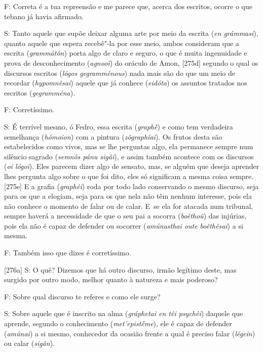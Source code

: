 F: Correta é a tua repreensão e me parece que, acerca dos escritos,
ocorre o que tebano já havia afirmado.

 

S: Tanto aquele que supõe deixar alguma arte por meio da escrita
(\emph{en grámmasi}), quanto aquele que espera recebê"-la por esse meio,
ambos consideram que a escrita (\emph{grammátôn}) porta algo de claro e
seguro, o que é muita ingenuidade e prova de desconhecimento
(\emph{agnooî}) do oráculo de Amon, [275d] segundo o qual os
discursos escritos (\emph{lógos gegramménous}) nada mais são do que um
meio de recordar (\emph{hypomnêsai}) aquele que já conhece
(\emph{eidóta}) os assuntos tratados nos escritos (\emph{gegramména}).

 

F: Corretíssimo.

 

S: É terrível mesmo, ó Fedro, essa escrita (\emph{graphḕ}) e como tem
verdadeira semelhança (\emph{hómoion}) com a pintura
(\emph{zôgraphíai}). Os frutos desta são estabelecidos como vivos, mas
se lhe perguntas algo, ela permanece sempre num silêncio sagrado
(\emph{semnôs pánu sigâi}), e assim também acontece com os discursos
(\emph{oi lógoi}). Eles parecem dizer algo de sensato, mas, se alguém
que deseja aprender lhes pergunta algo sobre o que foi dito, eles só
significam a mesma coisa sempre. [275e] E a grafia (\emph{graphêi})
roda por todo lado conservando o mesmo discurso, seja para os que a
elogiam, seja para os que nela não têm nenhum interesse, pois ela não
conhece o momento de falar ou de calar. E~se ela for atacada num
tribunal, sempre haverá a necessidade de que o seu pai a socorra
(\emph{boêthoû}) das injúrias, pois ela não é capaz de defender ou
socorrer (\emph{amúnasthai oute boêthêsai}) a si mesma.

 

F: Também isso que dizes é corretíssimo.

 

[276a] S: O quê? Dizemos que há outro discurso, irmão legítimo
deste, mas surgido por outro modo, melhor quanto à natureza e mais
poderoso?

 

F: Sobre qual discurso te referes e como ele surge?

 

S: Sobre aquele que é inscrito na alma (\emph{gráphetai en têi psychêi})
daquele que aprende, segundo o conhecimento (\emph{met'epistḗme}), ele é
capaz de defender (\emph{amûnai}) a si mesmo, conhecedor da ocasião
frente a qual é preciso falar (\emph{légein}) ou calar (\emph{sigân}).

